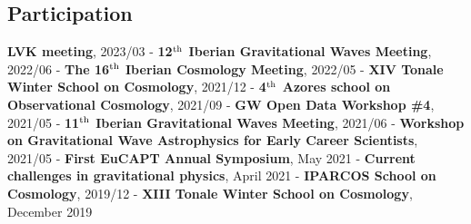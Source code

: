\documentclass[letterpaper]{twentysecondcv} %
\begin{document}
\subsection{Participation}
{\small
    \textbf{LVK meeting}, 2023/03 
    - \textbf{12$^{\rm th}$ Iberian Gravitational Waves Meeting}, 2022/06
    - \textbf{The 16$^{\rm th}$ Iberian Cosmology Meeting}, 2022/05
    - \textbf{XIV Tonale Winter School on Cosmology}, 2021/12
    - \textbf{4$^{\rm th}$ Azores school on Observational Cosmology}, 2021/09
    - \textbf{GW Open Data Workshop \#4}, 2021/05
    - \textbf{11$^{\rm th}$ Iberian Gravitational Waves Meeting}, 2021/06
    - \textbf{Workshop on Gravitational Wave Astrophysics for Early Career Scientists}, 2021/05
    - \textbf{First EuCAPT Annual Symposium}, May 2021
    - \textbf{Current challenges in gravitational physics}, April 2021
    - \textbf{IPARCOS School on Cosmology}, 2019/12
    - \textbf{XIII Tonale Winter School on Cosmology}, December 2019
}

\fi
\end{document}

